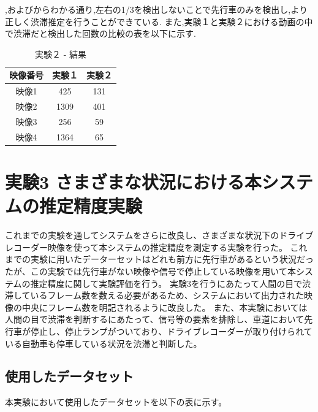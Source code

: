 ,およびからわかる通り,左右の1/3を検出しないことで先行車のみを検出し,より正しく渋滞推定を行うことができている.
また,実験１と実験２における動画の中で渋滞だと検出した回数の比較の表を以下に示す.

\begin{table}[htbp]
  \centering
  \begin{scriptsize}
  \begin{tabular}{ccc}
  \toprule
映像番号 & 実験１ & 実験２\\
  \midrule
映像1 & 425 & 131\\
映像2 & 1309 & 401\\
映像3 & 256 & 59\\
映像4 & 1364 & 65\\
  \bottomrule
  \end{tabular}
  \end{scriptsize}
  \caption{実験２ - 結果}
  \label{tab:dataset}
\end{table}
\newpage
\section{実験3 さまざまな状況における本システムの推定精度実験}
これまでの実験を通してシステムをさらに改良し、さまざまな状況下のドライブレコーダー映像を使って本システムの推定精度を測定する実験を行った。
これまでの実験に用いたデーターセットはどれも前方に先行車があるという状況だったが、この実験では先行車がない映像や信号で停止している映像を用いて本システムの推定精度に関して実験評価を行う。
実験3を行うにあたって人間の目で渋滞しているフレーム数を数える必要があるため、システムにおいて出力された映像の中央にフレーム数を明記されるように改良した。
また、本実験においては人間の目で渋滞を判断するにあたって、信号等の要素を排除し、車道において先行車が停止し、停止ランプがついており、ドライブレコーダーが取り付けられている自動車も停車している状況を渋滞と判断した。
%
%
%

\subsection{使用したデータセット}
本実験において使用したデータセットを以下の表に示す。

